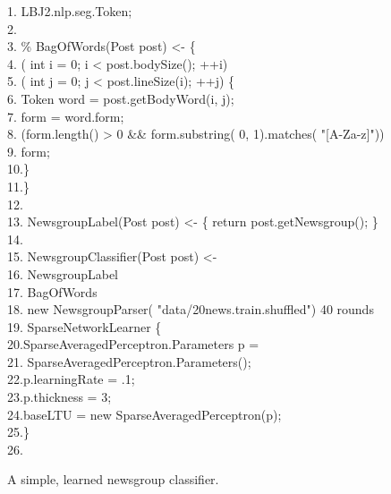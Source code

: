 \begin{figure}[t]
\begin{code}
1.  LBJ2.nlp.seg.Token;\\
2. \>\\
3. \% BagOfWords(Post post) <- \{\\
4. \> ({\color{ForestGreen} int} i =
      {\color{BrickRed} 0}; i < post.bodySize(); ++i)\\
5. \>\> ({\color{ForestGreen} int} j =
        {\color{BrickRed} 0}; j < post.lineSize(i); ++j) \{\\
6. \>\>\>\>Token word = post.getBodyWord(i, j);\\
7. \>\>\> form = word.form;\\
8. \>\>\> (form.length() > {\color{BrickRed} 0}
        \&\& form.substring({\color{BrickRed} 0},
            {\color{BrickRed} 1}).matches({\color{BrickRed} "[A-Za-z]"})) \\
9. \>\>\>\> form;\\
10.\>\>\>\}\\
11.\>\}\\
12.\>\\
13. NewsgroupLabel(Post post) <-
     \{ {\color{YellowOrange} return} post.getNewsgroup(); \}\\
14.\>\\
15. NewsgroupClassifier(Post post) <-\\
16. NewsgroupLabel\\
17.\> BagOfWords\\
18.\> {\color{YellowOrange} new}
    NewsgroupParser({\color{BrickRed} "data/20news.train.shuffled"})
    {\color{BrickRed} 40} {\color{RoyalBlue} rounds}\\
19.\> SparseNetworkLearner \{\\
20.\>\>\>SparseAveragedPerceptron.Parameters p =\\
21.\>\>\> SparseAveragedPerceptron.Parameters();\\
22.\>\>\>p.learningRate = {\color{BrickRed} .1};\\
23.\>\>\>p.thickness = {\color{BrickRed} 3};\\
24.\>\>\>baseLTU = {\color{YellowOrange} new} SparseAveragedPerceptron(p);\\
25.\>\>\}\\
26.
\end{code}
\caption{A simple, learned newsgroup classifier.}
\label{fig:lbj20news}
\end{figure}

